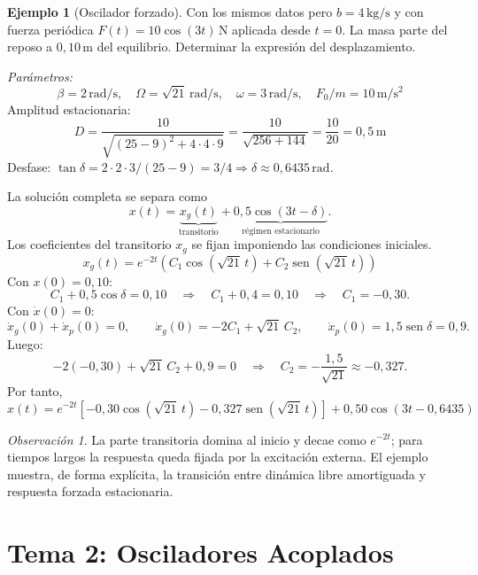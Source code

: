 \documentclass[12pt, a4paper]{article}
\theoremstyle{plain}
\theoremstyle{definition}
\newtheorem{ejemplo}{Ejemplo}[section]
\theoremstyle{remark}
\newtheorem*{observacion}{Observación}
\DeclareMathOperator{\sen}{sen}
\begin{document}
\begin{ejemplo}[Oscilador forzado]
Con los mismos datos pero $b = 4\,\mathrm{kg/s}$ y con fuerza periódica
$F(t) = 10\cos(3t)\,\mathrm{N}$ aplicada desde $t=0$. La masa parte del reposo a
$0{,}10\,\mathrm{m}$ del equilibrio. Determinar la expresión del desplazamiento.

\textit{Parámetros:}
\begin{equation}
  \beta = 2\,\mathrm{rad/s},\quad
  \Omega = \sqrt{21}\,\mathrm{rad/s},\quad
  \omega = 3\,\mathrm{rad/s},\quad
  F_0/m = 10\,\mathrm{m/s^2}
\end{equation}
Amplitud estacionaria:
\begin{equation}
  D = \frac{10}{\sqrt{(25-9)^2 + 4\cdot 4\cdot 9}} =
      \frac{10}{\sqrt{256+144}} = \frac{10}{20} = 0{,}5\,\mathrm{m}
\end{equation}
Desfase: $\tan\delta = 2\cdot 2\cdot 3/(25-9) = 3/4 \Rightarrow \delta \approx 0{,}6435\,\mathrm{rad}$.

La solución completa se separa como
\[
  x(t)=\underbrace{x_g(t)}_{\text{transitorio}}+
       \underbrace{0{,}5\cos(3t-\delta)}_{\text{régimen estacionario}}.
\]
Los coeficientes del transitorio $x_g$ se fijan imponiendo las condiciones iniciales.
\[
  x_g(t)=e^{-2t}\!\left(C_1\cos(\sqrt{21}\,t)+C_2\sen(\sqrt{21}\,t)\right)
\]
Con $x(0)=0{,}10$:
\[
  C_1+0{,}5\cos\delta=0{,}10
  \quad\Rightarrow\quad
  C_1+0{,}4=0{,}10
  \quad\Rightarrow\quad
  C_1=-0{,}30.
\]
Con $\dot{x}(0)=0$:
\[
  \dot{x}_g(0)+\dot{x}_p(0)=0,\qquad
  \dot{x}_g(0)=-2C_1+\sqrt{21}\,C_2,\qquad
  \dot{x}_p(0)=1{,}5\sen\delta=0{,}9.
\]
Luego:
\[
  -2(-0{,}30)+\sqrt{21}\,C_2+0{,}9=0
  \quad\Rightarrow\quad
  C_2=-\frac{1{,}5}{\sqrt{21}}\approx -0{,}327.
\]
Por tanto,
\begin{equation}
  \boxed{
  x(t)=e^{-2t}\!\left[-0{,}30\cos(\sqrt{21}\,t)-0{,}327\sen(\sqrt{21}\,t)\right]
  +0{,}50\cos(3t-0{,}6435)
  }
\end{equation}
\begin{observacion}
La parte transitoria domina al inicio y decae como $e^{-2t}$; para tiempos largos la
respuesta queda fijada por la excitación externa. El ejemplo muestra, de forma explícita,
la transición entre dinámica libre amortiguada y respuesta forzada estacionaria.
\end{observacion}
\end{ejemplo}

\section{Tema 2: Osciladores Acoplados}
\end{document}
